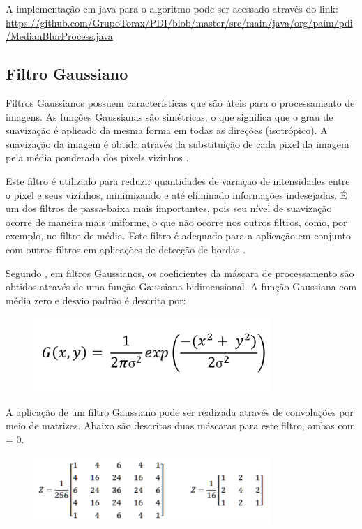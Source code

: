 \documentclass[
	12pt,				%
	oneside,			%
	a4paper,			%
	english,			%
	french,				%
	spanish,			%
	brazil,				%
	]{abntex2}
\begin{document}
A implementação em java para o algoritmo pode ser acessado através do link:
\url{https://github.com/GrupoTorax/PDI/blob/master/src/main/java/org/paim/pdi/MedianBlurProcess.java} 

\subsection{Filtro Gaussiano}
Filtros Gaussianos possuem características que são úteis para o processamento de imagens. As funções Gaussianas são simétricas, o que significa que o grau de suavização é aplicado da mesma forma em todas as direções (isotrópico). A suavização da imagem é obtida através da substituição de cada pixel da imagem pela média ponderada dos pixels vizinhos \cite{pedriniSchwartz:2008}. 

Este filtro é utilizado para reduzir quantidades de variação de intensidades entre o pixel e seus vizinhos, minimizando e até eliminado informações indesejadas. É um dos filtros de passa-baixa mais importantes, pois seu nível de suavização ocorre de maneira mais uniforme, o que não ocorre nos outros filtros, como, por exemplo, no filtro de média. Este filtro é adequado para a aplicação em conjunto com outros filtros em aplicações de detecção de bordas \cite{conciAzevedoLeta:2008}.   

Segundo \citet{pedriniSchwartz:2008}, em filtros Gaussianos, os coeficientes da máscara de processamento são obtidos através de uma função Gaussiana bidimensional. A função Gaussiana com média zero e desvio padrão é descrita por:

\begin{figure}[ht]
\centering
\includegraphics[width=0.8\textwidth]{imagens/gauss_formula.png}
\end{figure}

A aplicação de um filtro Gaussiano pode ser realizada através de convoluções por meio de matrizes. Abaixo são descritas duas máscaras para este filtro, ambas com = 0.

\begin{figure}[ht]
\centering
\includegraphics[width=0.8\textwidth]{imagens/gauss_mascara.png}
\end{figure}
\end{document}
